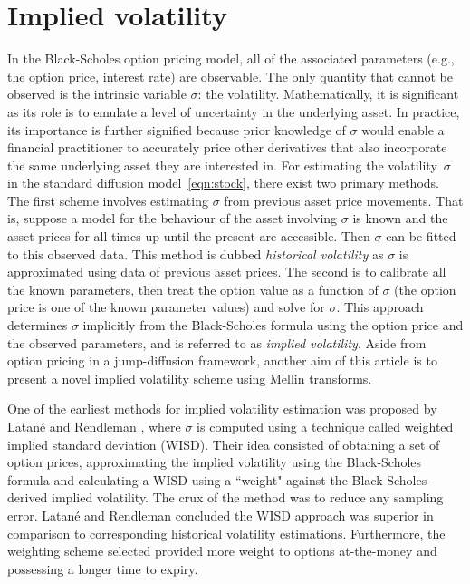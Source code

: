 \section{Implied volatility}
		In the Black-Scholes option pricing model, all of the associated parameters (e.g., the option price, interest rate) are observable. The only quantity that cannot be observed is the intrinsic variable $\sigma$: the volatility. Mathematically, it is significant as its role is to emulate a level of uncertainty in the underlying asset. In practice, its importance is further signified because prior knowledge of $\sigma$ would enable a financial practitioner to accurately price other derivatives that also incorporate the same underlying asset they are interested in. 
		For estimating the volatility~$\sigma$ in the standard diffusion model~\eqref{eqn:stock}, there exist two primary methods. The first scheme involves estimating $\sigma$ from previous asset price movements. That is, suppose a model for the behaviour of the asset involving $\sigma$ is known and the asset prices for all times up until the present are accessible. Then $\sigma$ can be fitted to this observed data. This method is dubbed \emph{historical volatility} as $\sigma$ is approximated using data of previous asset prices. The second is to calibrate all the known parameters, then treat the option value as a function of $\sigma$ (the option price is one of the known parameter values) and solve for $\sigma$. This approach determines $\sigma$ implicitly from the Black-Scholes formula using the option price and the observed parameters, and is referred to as \emph{implied volatility}.  Aside from option pricing in a jump-diffusion framework, another aim of this article is to present a novel implied volatility scheme using Mellin transforms.

One of the earliest methods for implied volatility estimation was proposed by Latan\'e and Rendleman \cite{Latane76}, where $\sigma$ is computed using a technique called weighted implied standard deviation (WISD). Their idea consisted of obtaining a set of option prices, approximating the implied volatility using the Black-Scholes formula and calculating a WISD using a ``weight" against the Black-Scholes-derived implied volatility. The crux of the method was to reduce any sampling error. Latan\'e and Rendleman concluded the WISD approach was superior in comparison to corresponding historical volatility estimations. Furthermore, the weighting scheme selected provided more weight to options at-the-money and possessing a longer time to expiry.

